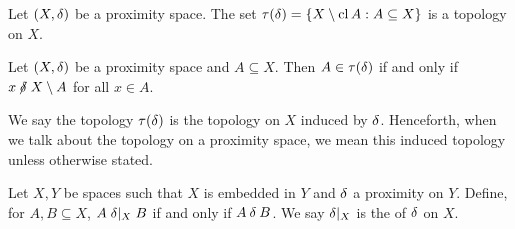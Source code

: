 \begin{corollary}
	\label{deltatop}
	Let \( (X, \mathbin{\delta}) \) be a proximity space.  The set \( \tau(\mathord{\delta}) = \{ X \setminus \operatorname{cl}{A} : A \subseteq X \} \) is a topology on \( X \).
\end{corollary}

\begin{corollary}
	\label{deltaallin}
	Let \( (X,\mathord{\delta}) \) be a proximity space and \( A \subseteq X \).  Then \( A \in \tau(\mathord{\delta}) \) if and only if \( x \nnear X \setminus A \) for all \( x \in A \).
\end{corollary}

We say the topology \( \tau(\mathord{\delta}) \) is the topology on \( X \) induced by \( \mathbin{\delta} \).  Henceforth, when we talk about the topology on a proximity space, we mean this induced topology unless otherwise stated.

\begin{definition}
	Let \( X,Y \) be spaces such that \( X \) is embedded in \( Y \) and \( \mathord{\delta} \) a proximity on \( Y \).  Define, for \( A,B \subseteq X \), \( A \mathrel{\mathord{\delta}|_X} B \) if and only if \( A \mathbin{\delta} B \).  We say \( \mathord{\delta}|_X \) is the  of \( \mathord{\delta} \) on \( X \).
\end{definition}

